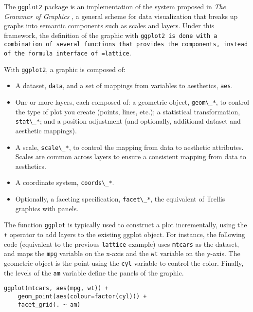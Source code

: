 \documentclass[smallroyalvopaper]{memoir}
\begin{document}

The \texttt{ggplot2} package \cite{Wickham2009} is an implementation of the system proposed in \emph{The Grammar of Graphics} \cite{Wilkinson1999}, a general scheme for data visualization that breaks up graphs into semantic components such as scales and layers. Under this framework, the definition of the graphic with \texttt{ggplot2 is done with a combination of several functions that provides the components, instead of the formula interface of
 =lattice}.

With \texttt{ggplot2}, a graphic is composed of:

\begin{itemize}
\item A dataset, \texttt{data}, and a set of mappings from variables to aesthetics, \texttt{aes}.
\item One or more layers, each composed of: a geometric object, \texttt{geom\textbackslash{}\_*}, to control the type of plot you create (points, lines, etc.); a statistical transformation, \texttt{stat\textbackslash{}\_*}; and a position adjustment (and optionally, additional dataset and aesthetic mappings).
\item A scale, \texttt{scale\textbackslash{}\_*}, to control the mapping from data to aesthetic attributes. Scales are common across layers to ensure a consistent mapping from data to aesthetics.
\item A coordinate system, \texttt{coords\textbackslash{}\_*}.
\item Optionally, a faceting specification, \texttt{facet\textbackslash{}\_*}, the equivalent of Trellis graphics with panels.
\end{itemize}

The function \texttt{ggplot} is typically used to construct a plot incrementally, using the \texttt{+} operator to add layers to the existing ggplot object.  For instance, the following code (equivalent to the previous \texttt{lattice} example) uses \texttt{mtcars} as the dataset, and maps the \texttt{mpg} variable on the x-axis and the \texttt{wt} variable on the y-axis. The geometric object is the point using the \texttt{cyl} variable to control the color. Finally, the levels of the \texttt{am} variable define the panels of the graphic. 

\lstset{language=R,label= ,caption= ,captionpos=b,numbers=none}
\begin{lstlisting}
ggplot(mtcars, aes(mpg, wt)) +
    geom_point(aes(colour=factor(cyl))) +
    facet_grid(. ~ am)
\end{lstlisting}
\end{document}
